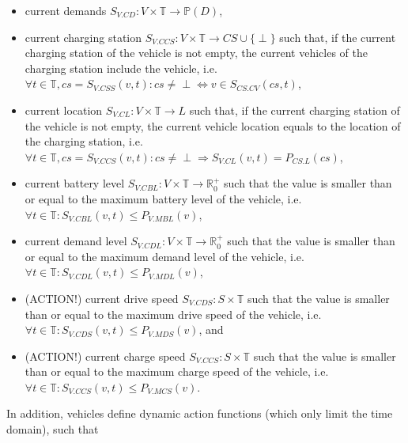 \documentclass[graybox]{svmult}
\begin{document}
\begin{itemize}
	\item current demands $S_{V.CD}: V \times \mathbb{T} \rightarrow \mathbb{P}(D)$,
	\item current charging station $S_{V.CCS}: V \times \mathbb{T} \rightarrow CS \cup \{\perp\}$ such that, if the current charging station of the vehicle is not empty, the current vehicles of the charging station include the vehicle, i.e.\ $\forall t \in \mathbb{T}, cs = S_{V.CSS}(v,t): cs \neq \perp \Leftrightarrow v \in S_{CS.CV}(cs,t)$,
	\item current location $S_{V.CL}: V \times \mathbb{T} \rightarrow L$ such that, if the current charging station of the vehicle is not empty, the current vehicle location equals to the location of the charging station, i.e.\ $\forall t \in \mathbb{T}, cs = S_{V.CCS}(v,t): cs \neq \perp \Rightarrow S_{V.CL}(v,t)=P_{CS.L}(cs)$,
	\item current battery level $S_{V.CBL}: V \times \mathbb{T} \rightarrow \mathbb{R}_0^+$ such that the value is smaller than or equal to the maximum battery level of the vehicle, i.e.\ $\forall t \in \mathbb{T}: S_{V.CBL}(v,t) \leq P_{V.MBL}(v)$,
	\item current demand level $S_{V.CDL}: V \times \mathbb{T} \rightarrow \mathbb{R}_0^+$ such that the value is smaller than or equal to the maximum demand level of the vehicle, i.e.\ $\forall t \in \mathbb{T}: S_{V.CDL}(v,t) \leq P_{V.MDL}(v)$,
	\item (ACTION!) current drive speed $S_{V.CDS}: S \times \mathbb{T}$ such that the value is smaller than or equal to the maximum drive speed of the vehicle, i.e.\ $\forall t \in \mathbb{T}: S_{V.CDS}(v,t) \leq P_{V.MDS}(v)$, and
	\item (ACTION!) current charge speed $S_{V.CCS}: S \times \mathbb{T}$ such that the value is smaller than or equal to the maximum charge speed of the vehicle, i.e.\ $\forall t \in \mathbb{T}: S_{V.CCS}(v,t) \leq P_{V.MCS}(v)$.
\end{itemize}

\noindent
In addition, vehicles define dynamic action functions (which only limit the time domain), such that
\end{document}
